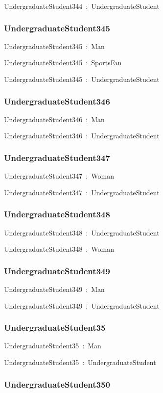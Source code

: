 \documentclass{article}
\begin{document}
UndergraduateStudent344~:~UndergraduateStudent

\subsubsection*{UndergraduateStudent345}

UndergraduateStudent345~:~Man

UndergraduateStudent345~:~SportsFan

UndergraduateStudent345~:~UndergraduateStudent

\subsubsection*{UndergraduateStudent346}

UndergraduateStudent346~:~Man

UndergraduateStudent346~:~UndergraduateStudent

\subsubsection*{UndergraduateStudent347}

UndergraduateStudent347~:~Woman

UndergraduateStudent347~:~UndergraduateStudent

\subsubsection*{UndergraduateStudent348}

UndergraduateStudent348~:~UndergraduateStudent

UndergraduateStudent348~:~Woman

\subsubsection*{UndergraduateStudent349}

UndergraduateStudent349~:~Man

UndergraduateStudent349~:~UndergraduateStudent

\subsubsection*{UndergraduateStudent35}

UndergraduateStudent35~:~Man

UndergraduateStudent35~:~UndergraduateStudent

\subsubsection*{UndergraduateStudent350}
\end{document}
